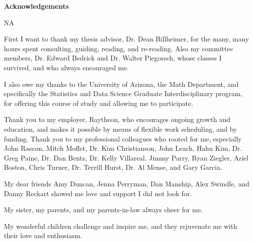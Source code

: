 \documentclass[12pt, a4paper]{article}
\begin{document}


% 



\noindent\begin{LARGE}\textbf{Acknowledgements}\end{LARGE}

\vspace{2cm}

NA

\vspace{1cm}

\noindent First I want to thank my thesis advisor, Dr. Dean Billheimer, for the many, many hours spent consulting, guiding, reading, and re-reading.  Also my committee members, Dr. Edward Bedrick and Dr. Walter Piegorsch, whose classes I survived, and who always encouraged me.

\vspace{1cm}

\noindent I also owe my thanks to the University of Arizona, the Math Department, and specifically the Statistics and Data Science Graduate Interdisciplinary program, for offering this course of study and allowing me to participate.

\vspace{1cm}

\noindent Thank you to my employer, Raytheon, who encourages ongoing growth and education, and makes it possible by means of flexible work scheduling, and by funding.  Thank you to my professional colleagues who rooted for me, especially John Rascon, Mitch Moffet, Dr. Kim Christianson, John Leach, Hahn Kim, Dr. Greg Paine, Dr. Dan Bentz, Dr. Kelly Villareal, Jimmy Parry, Ryan Ziegler, Ariel Boston, Chris Turner, Dr. Terrill Hurst, Dr. Al Mense, and Gary Garcia.

\vspace{1cm}

\noindent My dear friends Amy Duncan, Jenna Perryman, Dan Manship, Alex Swindle, and Danny Reckart showed me love and support I did not look for.

\vspace{1cm}

\noindent My sister, my parents, and my parents-in-law always cheer for me.

\vspace{1cm}

\noindent My wonderful children challenge and inspire me, and they rejuvenate me with their love and enthusiasm.
\end{document}
